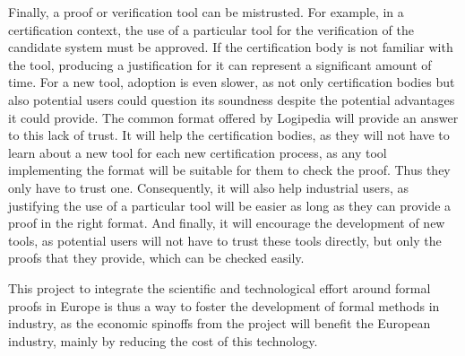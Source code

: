 Finally, a proof or verification tool can be mistrusted. For example,
in a certification context, the use of a particular tool for the
verification of the candidate system must be approved. If the
certification body is not familiar with the tool, producing a
justification for it can represent a significant amount of time. For
a new tool, adoption is even slower, as not only certification
bodies but also potential users could question its soundness despite
the potential advantages it could provide. The common format offered
by Logipedia will provide an answer to this lack of trust. It will help
the certification bodies, as they will not have to learn about a new
tool for each new certification process, as any tool implementing
the format will be suitable for them to check the proof. Thus they
only have to trust one. Consequently, it will also help industrial
users, as justifying the use of a particular tool will be easier as
long as they can provide a proof in the right format. And finally, it
will encourage the development of new tools, as potential users will
not have to trust these tools directly, but only the proofs that they
provide, which can be checked easily.

This project to integrate the scientific and technological effort
around formal proofs in Europe is thus a way to foster the
development of formal methods in industry, as the economic spinoffs
from the project will benefit the European industry, mainly by reducing
the cost of this technology.

